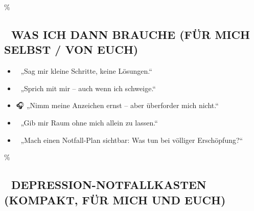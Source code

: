 \hypertarget{was-ich-dann-brauche-fuxfcr-mich-selbst-von-euch}{\%
\subsection{🧭 WAS ICH DANN BRAUCHE (FÜR MICH SELBST / VON EUCH)}\label{was-ich-dann-brauche-fuxfcr-mich-selbst-von-euch}}

\begin{itemize}
\tightlist
\item
  🧠 „Sag mir kleine Schritte, keine Lösungen.``
\end{itemize}

\begin{itemize}
\tightlist
\item
  💬 „Sprich mit mir -- auch wenn ich schweige.``
\end{itemize}

\begin{itemize}
\tightlist
\item
  🎧 „Nimm meine Anzeichen ernst -- aber überforder mich nicht.``
\end{itemize}

\begin{itemize}
\tightlist
\item
  🧍 „Gib mir Raum ohne mich allein zu lassen.``
\end{itemize}

\begin{itemize}
\tightlist
\item
  📎 „Mach einen Notfall-Plan sichtbar: Was tun bei völliger Erschöpfung?{}``
\end{itemize}

\hypertarget{depression-notfallkasten-kompakt-fuxfcr-mich-und-euch}{\%
\subsection{🧰 DEPRESSION-NOTFALLKASTEN (KOMPAKT, FÜR MICH UND EUCH)}\label{depression-notfallkasten-kompakt-fuxfcr-mich-und-euch}}

